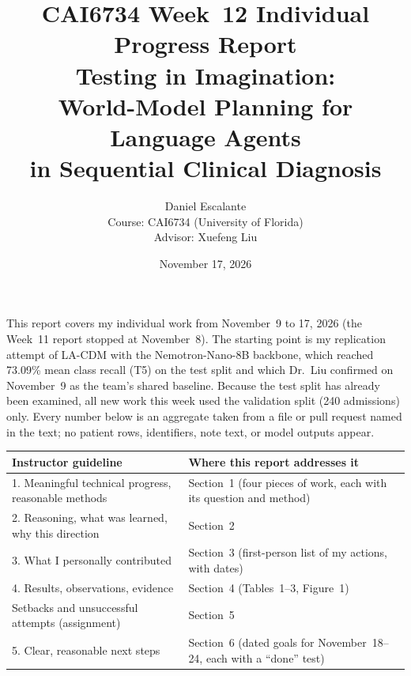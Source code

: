 \documentclass[11pt,letterpaper]{article}
\title{\textbf{CAI6734 Week~12 Individual Progress Report}\\[0.35em]
\large Testing in Imagination:\\
World-Model Planning for Language Agents\\
in Sequential Clinical Diagnosis}
\author{Daniel Escalante\\[0.4em]
\small Course: CAI6734 (University of Florida)\\
Advisor: Xuefeng Liu}
\date{November 17, 2026}
\begin{document}
\maketitle
\thispagestyle{empty}

\noindent
This report covers my individual work from November~9 to 17, 2026 (the Week~11 report stopped at November~8). The starting point is my replication attempt of LA-CDM with the Nemotron-Nano-8B backbone, which reached 73.09\% mean class recall (T5) on the test split and which Dr.~Liu confirmed on November~9 as the team's shared baseline. Because the test split has already been examined, all new work this week used the validation split (240 admissions) only. Every number below is an aggregate taken from a file or pull request named in the text; no patient rows, identifiers, note text, or model outputs appear.

\medskip
\noindent
\begin{tabularx}{\linewidth}{@{}lX@{}}
\toprule
\textbf{Instructor guideline} & \textbf{Where this report addresses it} \\
\midrule
1. Meaningful technical progress, reasonable methods & Section~1 (four pieces of work, each with its question and method) \\
2. Reasoning, what was learned, why this direction & Section~2 \\
3. What I personally contributed & Section~3 (first-person list of my actions, with dates) \\
4. Results, observations, evidence & Section~4 (Tables~1--3, Figure~1) \\
Setbacks and unsuccessful attempts (assignment) & Section~5 \\
5. Clear, reasonable next steps & Section~6 (dated goals for November~18--24, each with a ``done'' test) \\
\bottomrule
\end{tabularx}
\end{document}
